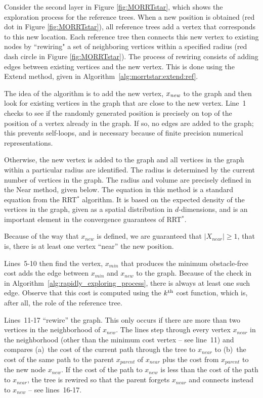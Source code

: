 \documentclass{article}
\begin{document}
Consider the second layer in Figure \ref{fig:MORRTstar}, which shows the exploration process for the reference trees.
When a new position is obtained (red dot in Figure \ref{fig:MORRTstar}), all reference trees add a vertex that corresponds to this new location.  
Each reference tree then connects this new vertex to existing nodes by ``rewiring" a set of neighboring vertices within a specified radius (red dash circle in Figure \ref{fig:MORRTstar}).  
The process of rewiring consists of adding edges between existing vertices and the new vertex.  This is done using the {\sc Extend} method, given in Algorithm~\ref{alg:morrtstar:extend:ref}.

The idea of the algorithm is to add the new vertex, $x_{\it new}$ to the graph and then look for existing vertices in the graph that are close to the new vertex. 
Line~1 checks to see if the randomly generated position is precisely on top of the position of a vertex already in the graph.  
If so, no edges are added to the graph; this prevents self-loops, and is necessary because of finite precision numerical representations.  

Otherwise, the new vertex is added to the graph and all vertices in the graph within a particular radius are identified.  
The radius is determined by the current number of vertices in the graph. 
The radius and volume are precisely defined in the {\sc Near} method, given below. The equation in this method is a standard equation from the RRT$^{*}$ algorithm.  It is based on the expected density of the vertices in the graph, given as a spatial distribution in $d$-dimensions, and is an important element in the convergence guarantees of RRT$^{*}$.


Because of the way that $x_{new}$ is defined, we are guaranteed that $|X_{near}| \geq 1$, that is, there is at least one vertex ``near'' the new position.

Lines~5-10 then find the vertex, $x_{min}$ that produces the minimum obstacle-free cost adds the edge between $x_{min}$ and $x_{new}$ to the graph.  
Because of the check in in Algorithm~\ref{alg:rapidly_exploring_process}, there is always at least one such edge.  
Observe that this cost is computed using the $k^{\rm th}$ cost function, which is, after all, the role of the reference tree.

Lines~11-17 ``rewire'' the graph.  
This only occurs if there are more than two vertices in the neighborhood of $x_{new}$.  
The lines step through every vertex $x_{near}$ in the neighborhood (other than the minimum cost vertex -- see line~11) and compares (a)~the cost of the current path through the tree to $x_{near}$ to (b)~the cost of the same path to the parent $x_{parent}$ of $x_{near}$ plus the cost from $x_{parent}$ to the new node $x_{new}$. 
If the cost of the path to $x_{new}$ is less than the cost of the path to $x_{near}$, the tree is rewired so that the parent forgets $x_{near}$ and connects instead to $x_{new}$ -- see lines~16-17.
\end{document}
